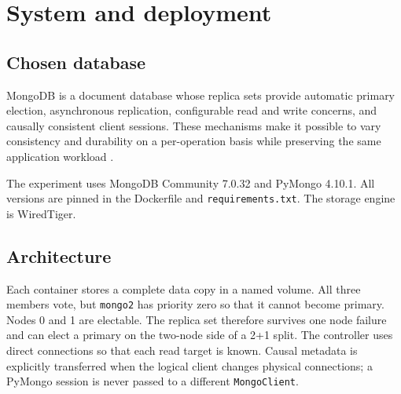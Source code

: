 \documentclass[11pt,a4paper]{article}
\begin{document}
\tableofcontents
\newpage

\section{System and deployment}

\subsection{Chosen database}
MongoDB is a document database whose replica sets provide automatic primary election,
asynchronous replication, configurable read and write concerns, and causally consistent
client sessions. These mechanisms make it possible to vary consistency and durability on
a per-operation basis while preserving the same application workload \cite{mongo-causal,mongo-read,mongo-write}.

The experiment uses MongoDB Community 7.0.32 and PyMongo 4.10.1. All versions are pinned
in the Dockerfile and \texttt{requirements.txt}. The storage engine is WiredTiger.

\subsection{Architecture}

\begin{center}
\end{center}

Each container stores a complete data copy in a named volume. All three members vote, but
\texttt{mongo2} has priority zero so that it cannot become primary. Nodes 0 and 1 are
electable. The replica set therefore survives one node failure and can elect a primary on
the two-node side of a 2+1 split. The controller uses direct connections so that each read
target is known. Causal metadata is explicitly transferred when the logical client changes
physical connections; a PyMongo session is never passed to a different \texttt{MongoClient}.
\end{document}
